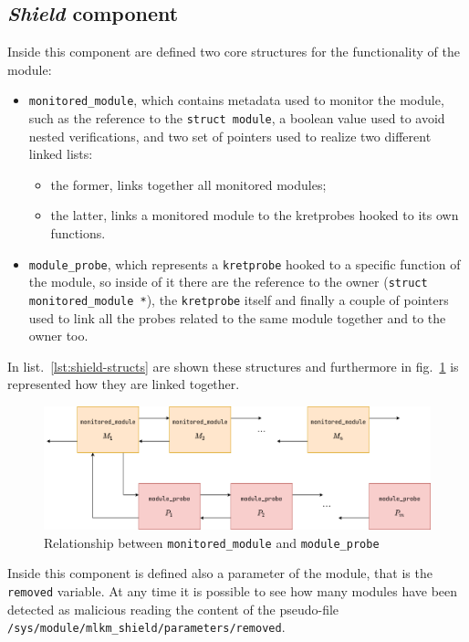 \documentclass{article}
\begin{document}
	\subsection{\emph{Shield} component}\label{sec:shield}
	Inside this component are defined two core structures for the functionality of the module:
	\begin{itemize}
		\item \texttt{monitored\_module}, which contains metadata used to monitor the module, such as the reference to
		the \texttt{struct module}, a boolean value used to avoid nested verifications, and two set of pointers used to
		realize two different linked lists:
		\begin{itemize}
			\item the former, links together all monitored modules;
			\item the latter, links a monitored module to the kretprobes hooked to its own functions.
		\end{itemize}

		\item \texttt{module\_probe}, which represents a \texttt{kretprobe} hooked to a specific function of the module,
		so inside of it there are the reference to the owner (\texttt{struct monitored\_module *}), the
		\texttt{kretprobe} itself and finally a couple of pointers used to link all the probes related to the same
		module together and to the owner too.
	\end{itemize}

	In list.~\ref{lst:shield-structs} are shown these structures and furthermore in fig.~\ref{fig:shield-structs} is
	represented how they are linked together.

	\begin{figure}[!htbp]
		\centering
		\includegraphics[scale=0.4]{shield-structs}
		\caption{Relationship between \texttt{monitored\_module} and \texttt{module\_probe}}
		\label{fig:shield-structs}
	\end{figure}

	Inside this component is defined also a parameter of the module, that is the \texttt{removed} variable. At any time
	it is possible to see how many modules have been detected as malicious reading the content of the pseudo-file
	\texttt{/sys/module/mlkm\_shield/parameters/removed}.
\end{document}
